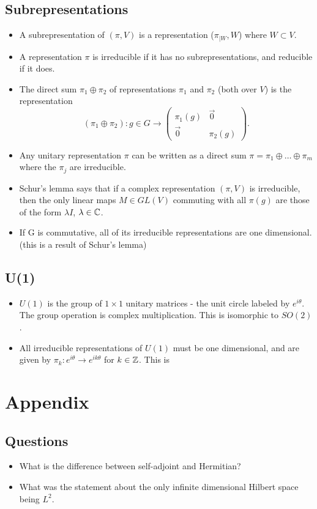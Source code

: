 \documentclass[a4paper]{article}
\begin{document}
\subsection{Subrepresentations}
\begin{itemize}
    \item A subrepresentation of $(\pi, V)$ is a representation ($\pi_{|W}, W$) where $W \subset V$.
    \item A representation $\pi$ is irreducible if it has no subrepresentations, and reducible if it does.
    \item The direct sum $\pi_1 \oplus \pi_2$ of representations $\pi_1$ and $\pi_2$ (both over $V$) is the representation $$(\pi_1 \oplus \pi_2) : g \in G \to \begin{pmatrix}\pi_1(g) & \vec{0} \\ \vec{0} & \pi_2(g)\end{pmatrix}.$$
    \item Any unitary representation $\pi$ can be written as a direct sum $\pi = \pi_1 \oplus \hdots \oplus \pi_m$ where the $\pi_j$ are irreducible. 
    \item Schur's lemma says that if a complex representation $(\pi, V)$ is irreducible, then the only linear maps $M \in GL(V)$ commuting with all $\pi(g)$ are those of the form $\lambda I$, $\lambda \in \mathbb{C}$.
    \item If G is commutative, all of its irreducible representations are one dimensional. (this is a result of Schur's lemma)
\end{itemize}

\subsection{U(1)}
\begin{itemize}
    \item $U(1)$ is the group of $1\times 1$ unitary matrices - the unit circle labeled by $e^{i\theta}$. The group operation is complex multiplication. This is isomorphic to $SO(2)$. 
    \item All irreducible representations of $U(1)$ must be one dimensional, and are given by $\pi_k: e^{i\theta} \to e^{ik\theta}$ for $k \in \mathbb{Z}$. This is 
\end{itemize}

\newpage
\section{Appendix}
\subsection{Questions}
\begin{itemize}
    \item What is the difference between self-adjoint and Hermitian?
    \item What was the statement about the only infinite dimensional Hilbert space being $L^2$. 
\end{itemize}
\end{document}
